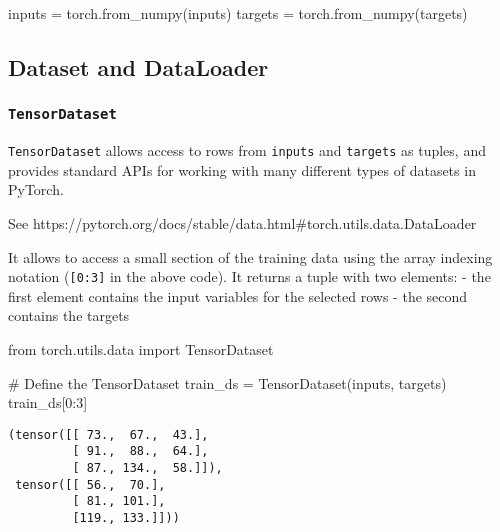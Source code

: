 \documentclass[
  letterpaper,
  DIV=11,
  numbers=noendperiod]{scrartcl}
\newenvironment{Shaded}{\begin{snugshade}}{\end{snugshade}}
\newcommand{\CommentTok}[1]{\textcolor[rgb]{0.37,0.37,0.37}{#1}}
\newcommand{\DecValTok}[1]{\textcolor[rgb]{0.68,0.00,0.00}{#1}}
\newcommand{\ImportTok}[1]{\textcolor[rgb]{0.00,0.46,0.62}{#1}}
\newcommand{\NormalTok}[1]{\textcolor[rgb]{0.00,0.23,0.31}{#1}}
\newcommand{\OperatorTok}[1]{\textcolor[rgb]{0.37,0.37,0.37}{#1}}
\begin{document}
\begin{Shaded}
\begin{Highlighting}[]
\NormalTok{inputs }\OperatorTok{=}\NormalTok{ torch.from\_numpy(inputs)}
\NormalTok{targets }\OperatorTok{=}\NormalTok{ torch.from\_numpy(targets)}
\end{Highlighting}
\end{Shaded}

\hypertarget{dataset-and-dataloader}{%
\subsection{Dataset and DataLoader}\label{dataset-and-dataloader}}

\hypertarget{tensordataset}{%
\subsubsection{\texorpdfstring{\texttt{TensorDataset}}{TensorDataset}}\label{tensordataset}}

\texttt{TensorDataset} allows access to rows from \texttt{inputs} and
\texttt{targets} as tuples, and provides standard APIs for working with
many different types of datasets in PyTorch.

See
https://pytorch.org/docs/stable/data.html\#torch.utils.data.DataLoader

It allows to access a small section of the training data using the array
indexing notation (\texttt{{[}0:3{]}} in the above code). It returns a
tuple with two elements: - the first element contains the input
variables for the selected rows - the second contains the targets

\begin{Shaded}
\begin{Highlighting}[]
\ImportTok{from}\NormalTok{ torch.utils.data }\ImportTok{import}\NormalTok{ TensorDataset}
\end{Highlighting}
\end{Shaded}

\begin{Shaded}
\begin{Highlighting}[]
\CommentTok{\# Define the TensorDataset}
\NormalTok{train\_ds }\OperatorTok{=}\NormalTok{ TensorDataset(inputs, targets)}
\NormalTok{train\_ds[}\DecValTok{0}\NormalTok{:}\DecValTok{3}\NormalTok{]}
\end{Highlighting}
\end{Shaded}

\begin{verbatim}
(tensor([[ 73.,  67.,  43.],
         [ 91.,  88.,  64.],
         [ 87., 134.,  58.]]),
 tensor([[ 56.,  70.],
         [ 81., 101.],
         [119., 133.]]))
\end{verbatim}
\end{document}
